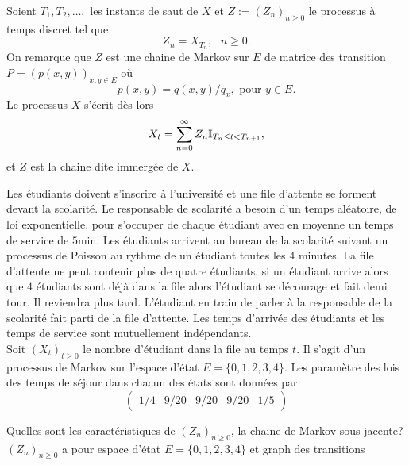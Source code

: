 Soient $T_1,T_2,\ldots,$ les instants de saut de $X$ et $Z:=(Z_n)_{n\geq0}$ le processus à temps discret tel que 
$$
Z_n = X_{T_{n}},\text{ }n\geq0.
$$
On remarque que $Z$ est une chaine de Markov sur $E$ de matrice des transition $P = (p(x,y))_{x,y\in E}$ où 
$$
p(x,y) = q(x,y)/ q_x,\text{ pour }y\in E.
$$
Le processus $X$ s'écrit dès lors 
$$
X_t = \sum_{n=0}^\infty Z_n\mathbb{I}_{T_n\leq t<T_{n+1}},
$$
et $Z$ est la chaine dite immergée de $X$. 
\begin{ex}\label{ex:registration}
Les étudiants doivent s'inscrire à l'université et une file d'attente se forment devant la scolarité. Le responsable de scolarité a besoin d'un temps aléatoire, de loi exponentielle, pour s'occuper de chaque étudiant avec en moyenne un temps de service de $5$min. Les étudiants arrivent au bureau de la scolarité suivant un processus de Poisson au rythme de un étudiant toutes les $4$ minutes. La file d'attente ne peut contenir plus de quatre étudiants, si un étudiant arrive alors que $4$ étudiants sont déjà dans la file alors l'étudiant se décourage et fait demi tour. Il reviendra plus tard. L'étudiant en train de parler à la responsable de la scolarité fait parti de la file d'attente. Les temps d'arrivée des étudiants et les temps de service sont mutuellement indépendants.\\

\noindent Soit $(X_t)_{t\geq0}$ le nombre d'étudiant dans la file au temps $t$. Il s'agit d'un processus de Markov sur l'espace d'état $E = \{0,1,2,3,4\}$. Les paramètre des lois des temps de séjour dans chacun des états sont données par 
$$
\left(\begin{array}{ccccc}1/4&9/20&9/20&9/20&1/5\end{array}\right)
$$

\noindent Quelles sont les caractéristiques de $(Z_n)_{n\geq0}$, la chaine de Markov sous-jacente?\\
\noindent $(Z_n)_{n\geq0}$ a pour espace d'état $E = \{0,1,2,3,4\}$ et graph des transitions
\begin{center}
\end{center}



\end{ex}
